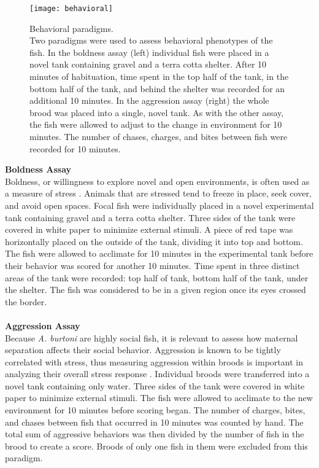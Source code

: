 \documentclass[12pt,twoside]{reedthesis}
\begin{document}
\begin{figure}[htbp] 
\begin{centering} 
\texttt{[image: behavioral]}
\caption[Behavioral paradigms]{\footnotesize{Behavioral paradigms. \\ Two paradigms were used to assess
  behavioral phenotypes of the fish. In the boldness assay (left) individual
  fish were placed in a novel tank containing gravel and a terra cotta shelter.
  After 10 minutes of habituation, time spent in the top half of the tank, in
  the bottom half of the tank, and behind the shelter was recorded for an
  additional 10 minutes. In the
  aggression assay (right) the whole brood was placed into a single, novel tank.
  As with the other assay, the fish were allowed to adjust to the change in
  environment for 10 minutes.
The number of chases, charges, and bites between fish were recorded for 10 minutes.}}
\label{subd}
\end{centering} 
\end{figure}

\noindent\textbf{Boldness Assay}\\
Boldness, or willingness to explore novel and open environments, is often used
as a measure of stress \citep{bannier_early_2017, francis_nongenomic_1999}. Animals that are stressed tend to freeze in place, seek
cover, and avoid open spaces. Focal fish were individually placed in a novel
experimental tank
containing gravel and a terra cotta shelter. Three sides of the tank were
covered in white paper to minimize external stimuli. A piece of red tape was
horizontally placed on the outside of the tank, dividing it into top and bottom.
The fish were allowed to acclimate for
10 minutes in the experimental tank before their behavior was scored for another
10 minutes. Time spent in three distinct areas of the tank were recorded: top half of tank,
bottom half of the tank, under the shelter. The fish was
considered to be in a given region once its eyes crossed the border.\\
\\
\noindent\textbf{Aggression Assay}\\
Because \textit{A. burtoni} are highly social fish, it is relevant to assess how
maternal separation affects their social behavior. Aggression is known to be
tightly correlated with stress, thus measuring aggression within broods is
important in analyzing their overall stress response \citep{gammie_effects_2006,
overli_behavioral_2004, honess_behavioural_2006, takahashi_aggression_2018}. Individual broods were
transferred into a novel tank containing only water. Three sides of the tank were
covered in white paper to minimize external stimuli. The fish were allowed
to acclimate to the new environment for 10 minutes before scoring began. The
number of charges, bites, and chases between fish that occurred in 10 minutes
was counted by hand. The total sum of aggressive behaviors was then divided by
the number of fish in the brood to create a score. Broods of only one fish in them were excluded from this paradigm.  
\end{document}
